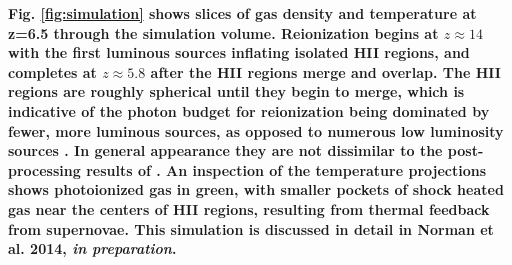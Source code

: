{\bf Fig. \ref{fig:simulation} shows slices of gas density and temperature at z=6.5 through the simulation volume. Reionization begins at $z \approx 14$ with the first luminous sources inflating isolated HII regions, and completes at 
$z \approx 5.8$ after the HII regions merge and overlap. The HII regions are roughly spherical until they begin to merge, which is
indicative of the photon budget for reionization being dominated by fewer, more luminous sources, as opposed to numerous low luminosity sources \cite{Zahn07}. In general appearance they are not dissimilar to the post-processing results of \cite{Iliev06,TracCen2007}.
An inspection of the temperature projections shows photoionized gas in green, with smaller pockets of shock heated gas near the centers of HII regions, resulting from thermal feedback from supernovae. This simulation is discussed in detail in Norman et al. 2014, {\em in preparation}.}

